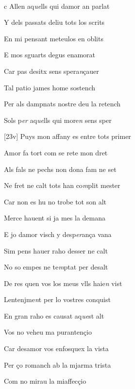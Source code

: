 \documentclass[12pt]{article}
\renewcommand{\espaiAbansEtiquetaPoema}{\vspace{0ex}}
\begin{document}
\begin{estrofa}

\espaiAbansEtiquetaPoema

\\

\end{estrofa}


\begin{estrofa}

 c Allen aq\textit{ue}lls qui damor an parlat

 Y dels passats deliu tots los scrits

 En mi pensant meteulos en oblits

 E mos sguarts degus enamorat

 Car pas desitx sens spera\textit{n}\c{c}auer

 Tal patio james home sostench

 Per als dampnats nostre deu la retench

 Sols p\textit{er} aq\textit{ue}lls qui more\textit{n} sens sper

\end{estrofa}



\begin{estrofa}

 [23v] Puys mon affany es entre tots primer

 Amor fa tort com se rete mon dret

 Als fals ne pechs non dona fam ne set

 Ne fret ne calt tots han co\textit{m}plit mester

 Car non es hu no trobe tot son alt

 Merce hauent si ja mes la demana

 E jo damor visch y desp\textit{er}an\c{c}a vana

 Sim pens hauer raho desser ne calt

\end{estrofa}



\begin{estrofa}

 No so empes ne te\textit{m}ptat per desalt

 De res quen vos los meus vlls haie\textit{n} vist

 Lentenjme\textit{n}t per lo vostres conquist

 En gran raho es causat aq\textit{ue}st alt

 Vos no veheu ma puranten\c{c}io

 Car desamor vos enfosquex la vista

 Per \c{c}o romanch ab la mjarma trista

 Com no mirau la miaffec\c{c}io

\end{estrofa}
\end{document}
